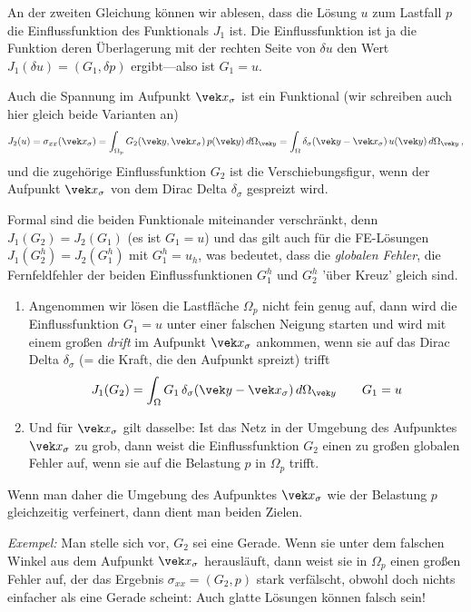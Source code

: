 {{{{{{An der zweiten Gleichung k\"{o}nnen wir ablesen, dass die L\"{o}sung $u$ zum Lastfall $p$ die Einflussfunktion des Funktionals $J_1$ ist. Die Einflussfunktion ist ja die Funktion deren \"{U}berlagerung mit der rechten Seite von $\delta u$ den Wert $J_1(\delta u) = (G_1, \delta p)$ ergibt---also ist $G_1 = u$.

Auch die Spannung im Aufpunkt $\vek x_\sigma$ ist ein Funktional (wir schreiben auch hier gleich beide Varianten an)
\begin{align}
J_2(u) = \sigma_{xx}(\vek x_\sigma) = \int_{\Omega_p} G_2(\vek y,\vek x_\sigma)\,p(\vek y)\,d\Omega_{\vek y} = \int_{\Omega} \delta_\sigma(\vek y-\vek x_\sigma)\,u(\vek y)\,d\Omega_{\vek y}\,,
\end{align}
und die zugeh\"{o}rige Einflussfunktion $G_2$ ist die Verschiebungsfigur, wenn der Aufpunkt $\vek x_\sigma$ von dem Dirac Delta $\delta_\sigma$ gespreizt wird.

Formal sind die beiden Funktionale miteinander verschr\"{a}nkt, denn $J_1(G_2) = J_2(G_1)$ (es ist $G_1 = u$) und das gilt auch f\"{u}r die FE-L\"{o}sungen  $J_1(G_2^h) = J_2(G_1^h)$ mit $G_1^h = u_h$, was bedeutet, dass die {\em globalen Fehler\/}, die Fernfeldfehler der beiden Einflussfunktionen $G_1^h$ und $G_2^h$ '\"{u}ber Kreuz' gleich sind.
\begin{enumerate}
  \item Angenommen wir l\"{o}sen die Lastfl\"{a}che $\Omega_p$ nicht fein genug auf, dann wird die Einflussfunktion $G_1 = u $ unter einer falschen Neigung starten und wird mit einem gro{\ss}en {\em drift\/} im Aufpunkt $\vek x_\sigma$ ankommen, wenn sie auf das Dirac Delta $\delta_\sigma$ (= die Kraft, die den Aufpunkt spreizt) trifft
      \begin{align}
      J_1(G_2) = \int_{\Omega} G_1\,\delta_\sigma(\vek y -\vek x_\sigma)\,d\Omega_{\vek y} \qquad G_1 = u
      \end{align}
  \item Und f\"{u}r $\vek x_\sigma$ gilt dasselbe: Ist das Netz in der Umgebung des Aufpunktes  $\vek x_\sigma$ zu grob, dann weist die Einflussfunktion $G_2$ einen zu gro{\ss}en globalen Fehler auf, wenn sie auf die Belastung $p$  in $\Omega_p$ trifft.
\end{enumerate}
Wenn man daher die Umgebung des Aufpunktes $\vek x_\sigma $ wie der Belastung $p $ gleichzeitig verfeinert, dann dient man beiden Zielen.

{\em Exempel:\/} Man stelle sich vor, $G_2$ sei eine Gerade. Wenn sie unter dem falschen Winkel aus dem Aufpunkt $\vek x_\sigma$ herausl\"{a}uft, dann weist sie in $\Omega_p$ einen gro{\ss}en Fehler auf, der das Ergebnis $\sigma_{xx} = (G_2,p)$ stark verf\"{a}lscht, obwohl doch nichts einfacher als eine Gerade scheint: Auch glatte L\"{o}sungen k\"{o}nnen falsch sein!



}}}}}}
